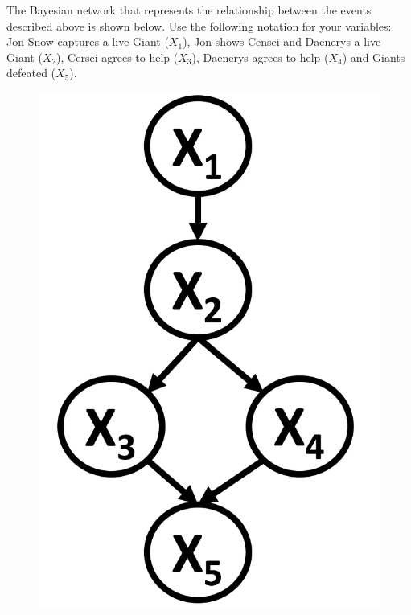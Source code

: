 \documentclass[11pt,addpoints,answers]{exam}
\begin{document}
The Bayesian network that represents the relationship between the events described above is shown below. Use the following notation for your variables: Jon Snow captures a live Giant ($X_1$), Jon shows Censei and Daenerys a live Giant  ($X_2$), Cersei agrees to help ($X_3$), Daenerys agrees to help ($X_4$) and Giants defeated ($X_5$).
\begin{figure}[!hbtp]
\centering
\includegraphics[scale=0.3]{figures/q2.png}
\end{figure}
\end{document}
